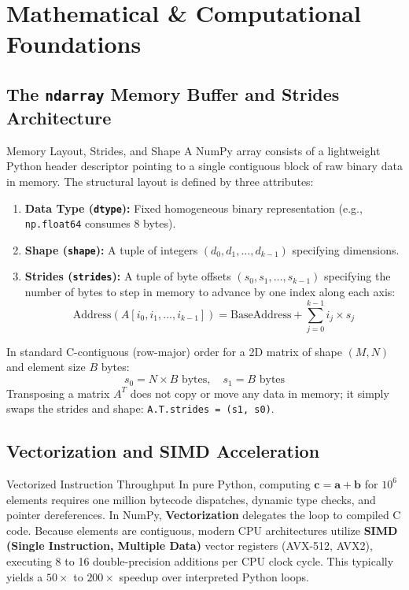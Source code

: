 \section{Mathematical \& Computational Foundations}

\subsection{The \texttt{ndarray} Memory Buffer and Strides Architecture}

\begin{definitionbox}{Memory Layout, Strides, and Shape}
 
A NumPy array consists of a lightweight Python header descriptor pointing to a single contiguous block of raw binary data in memory. The structural layout is defined by three attributes:
\begin{enumerate}
    \item \textbf{Data Type (\texttt{dtype}):} Fixed homogeneous binary representation (e.g., \texttt{np.float64} consumes 8 bytes).
    \item \textbf{Shape (\texttt{shape}):} A tuple of integers $(d_0, d_1, \dots, d_{k-1})$ specifying dimensions.
    \item \textbf{Strides (\texttt{strides}):} A tuple of byte offsets $(s_0, s_1, \dots, s_{k-1})$ specifying the number of bytes to step in memory to advance by one index along each axis:
    \begin{equation}
    \text{Address}(A[i_0, i_1, \dots, i_{k-1}]) = \text{BaseAddress} + \sum_{j=0}^{k-1} i_j \times s_j
    \end{equation}
\end{enumerate}
In standard C-contiguous (row-major) order for a 2D matrix of shape $(M, N)$ and element size $B$ bytes:
\begin{equation}
s_0 = N \times B \text{ bytes}, \quad s_1 = B \text{ bytes}
\end{equation}
Transposing a matrix $A^T$ does not copy or move any data in memory; it simply swaps the strides and shape: \texttt{A.T.strides = (s1, s0)}.
\end{definitionbox}

\subsection{Vectorization and SIMD Acceleration}

\begin{theorembox}{Vectorized Instruction Throughput}
 
In pure Python, computing $\mathbf{c} = \mathbf{a} + \mathbf{b}$ for $10^6$ elements requires one million bytecode dispatches, dynamic type checks, and pointer dereferences.
In NumPy, \textbf{Vectorization} delegates the loop to compiled C code. Because elements are contiguous, modern CPU architectures utilize \textbf{SIMD (Single Instruction, Multiple Data)} vector registers (AVX-512, AVX2), executing 8 to 16 double-precision additions per CPU clock cycle. This typically yields a $50\times$ to $200\times$ speedup over interpreted Python loops.
\end{theorembox}

